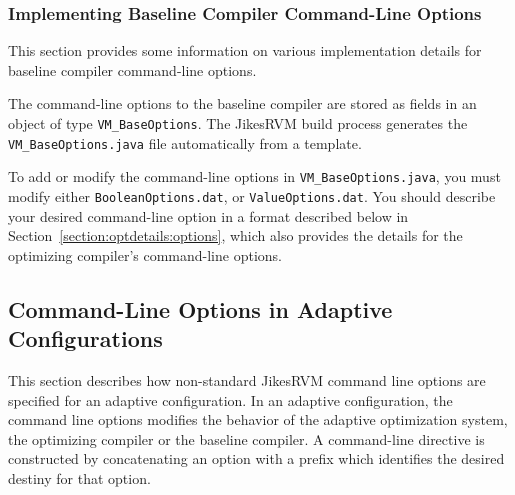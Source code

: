 \subsubsection{Implementing Baseline Compiler Command-Line Options}

This section provides some information on various
implementation details for baseline compiler command-line options.

The command-line options to the baseline compiler are
stored as fields in an object of type {\tt VM\_BaseOptions}.
The Jikes\trademark RVM build process generates the {\tt VM\_BaseOptions.java} 
file automatically from a template.  

To add or modify the command-line options in {\tt VM\_BaseOptions.java},
you must modify either {\tt BooleanOptions.dat}, or {\tt ValueOptions.dat}.
You should describe your desired command-line option in a format 
described below in Section~\ref{section:optdetails:options}, which 
also provides the details for the optimizing compiler's command-line options.

\JikesTMFooter

\subsection{Command-Line Options in Adaptive Configurations}
\label{subsection:adaptive:cmdline}

This section describes how non-standard Jikes\trademark RVM command line options are 
specified for an adaptive configuration.
In an adaptive configuration, the command line options modifies
the behavior of the adaptive optimization system,
the optimizing compiler or the baseline compiler.
A command-line directive is constructed by concatenating an option 
with a prefix which identifies the desired destiny for that option.

